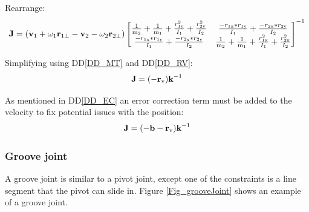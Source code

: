\documentclass[12pt]{article}
\begin{document}
\noindent
Rearrange:
\begin{equation*}
\textbf J 
= (\textbf v_\text{1} + \omega_\text{1} \textbf r_\text{1$\perp$} - \textbf
v_\text{2} - \omega_\text{2}\textbf r_\text{2$\perp$})
\begin{bmatrix}
\frac{1}{ \textnormal m_\text{2}} + \frac{1}{ \textnormal m_\text{1}}+
\frac{r_\text{1y}^{2}}{I_\text{1}} + \frac{r_\text{2y}^{2}}{I_\text{2}} &
\frac{-r_\text{1x} * r_\text{1y}}{I_\text{1}} + \frac{-r_\text{2x} *
r_\text{2y}}{I_\text{2}}\\
\frac{-r_\text{1x} * r_\text{1y}}{I_\text{1}} + \frac{-r_\text{2x} *
r_\text{2y}}{I_\text{2}} &
\frac{1}{ \textnormal m_\text{2}} + \frac{1}{ \textnormal m_\text{1}}+
\frac{r_\text{1x}^{2}}{I_\text{1}} + \frac{r_\text{2x}^{2}}{I_\text{2}}\\
        \end{bmatrix}^{-1}
\end{equation*}

\noindent
Simplifying using DD\ref{DD_MT} and DD\ref{DD_RV}:
\begin{equation*}
\textbf J = (-\textbf r_\text{v}) \textbf k^{-1}
\end{equation*}


\noindent
As mentioned in DD\ref{DD_EC} an error correction term must be added to the
velocity to fix potential issues with the position:
\begin{equation*}
\textbf J =(-\textbf b -\textbf r_\text{v}) \textbf k^{-1}
\end{equation*}

\subsubsection{Groove joint} \label{SecConstraintFig}
A groove joint is similar to a pivot joint, except one of the constraints
 is a line segment that the pivot can slide in.
Figure \ref{Fig_grooveJoint} shows an example of a groove joint.
~\newline
\end{document}

